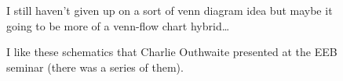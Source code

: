 \documentclass[
]{article}
\begin{document}
\begin{figure}


\caption{\label{fig-venn}I still haven't given up on a sort of venn
diagram idea but maybe it going to be more of a venn-flow chart
hybrid\ldots{}}

\end{figure}%

\begin{figure}


\caption{\label{fig-outhwaite}I like these schematics that Charlie
Outhwaite presented at the EEB seminar (there was a series of them).}

\end{figure}%
\end{document}
